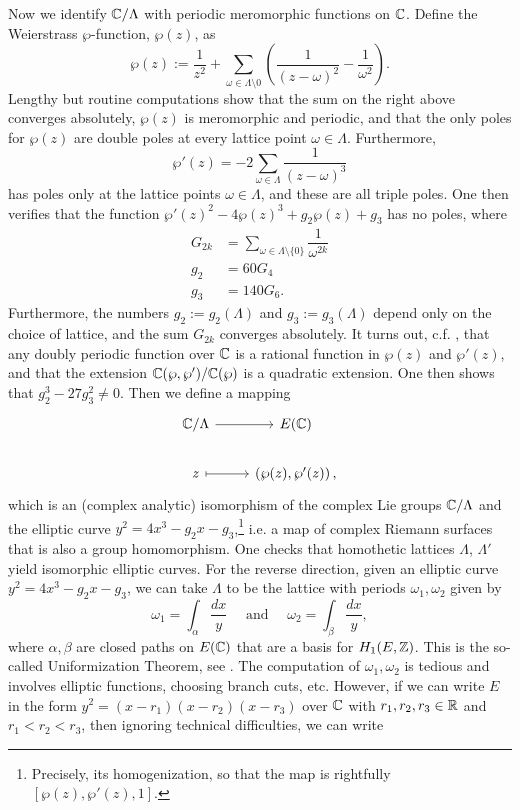 Now we identify $\mathbb{C}/\Lambda$ with periodic meromorphic functions on $\mathbb{C}$. Define the Weierstrass $\wp$-function, $\wp(z)$, as 
	\[
	\wp(z):= \dfrac{1}{z^2} + \sum_{\omega \in \Lambda \setminus 0} \left( \dfrac{1}{(z - \omega)^2} - \dfrac{1}{\omega^2} \right). 
	\]
Lengthy but routine computations show that the sum on the right above converges absolutely, $\wp(z)$ is meromorphic and periodic, and that the only poles for $\wp(z)$ are double poles at every lattice point $\omega \in \Lambda$. Furthermore,
	\[
	\wp'(z)= -2 \sum_{\omega \in \Lambda} \dfrac{1}{(z- \omega)^3}
	\]
has poles only at the lattice points $\omega \in \Lambda$, and these are all triple poles. One then verifies that the function $\wp'(z)^2 - 4 \wp(z)^3 + g_2 \wp(z) + g_3$ has no poles, where
	\[
	\begin{aligned}
	G_{2k}&= \sum_{\omega \in \Lambda \setminus \{0\}} \dfrac{1}{\omega^{2k}} \\
	g_2&= 60 G_4 \\
	g_3&= 140 G_6.
	\end{aligned}
	\]
Furthermore, the numbers $g_2:= g_2(\Lambda)$ and $g_3:= g_3(\Lambda)$ depend only on the choice of lattice, and the sum $G_{2k}$ converges absolutely. It turns out, c.f. \cite[VI.3]{silvermanarithmetic}, that any doubly periodic function over $\mathbb{C}$ is a rational function in $\wp(z)$ and $\wp'(z)$, and that the extension $\mathbb{C}(\wp, \wp')/\mathbb{C}(\wp)$ is a quadratic extension. One then shows that $g_2^3 - 27g_3^2 \neq 0$. Then we define a mapping
	\[
	\begin{tikzcd}
	\C/\Lambda \arrow{r} & E(\C) \\ 
	z \rar[maps to] & \left( \wp(z), \wp'(z) \right),
	\end{tikzcd}
	\]
which is an (complex analytic) isomorphism of the complex Lie groups $\mathbb{C}/\Lambda$ and the elliptic curve $y^2= 4x^3 - g_2 x - g_3$,\footnote{Precisely, its homogenization, so that the map is rightfully $[\wp(z), \wp'(z), 1]$.} i.e. a map of complex Riemann surfaces that is also a group homomorphism. One checks that homothetic lattices $\Lambda$, $\Lambda'$ yield isomorphic elliptic curves. For the reverse direction, given an elliptic curve $y^2= 4x^3 - g_2 x - g_3$, we can take $\Lambda$ to be the lattice with periods $\omega_1, \omega_2$ given by
	\[
	\omega_1= \int_\alpha \dfrac{dx}{y} \quad\text{ and }\quad \omega_2= \int_\beta \dfrac{dx}{y},
	\]
where $\alpha, \beta$ are closed paths on $E(\mathbb{C})$ that are a basis for $H_1(E, \mathbb{Z})$. This is the so-called Uniformization Theorem, see \cite[IV.5, Thm.~5.1]{silvermanarithmetic}. The computation of $\omega_1, \omega_2$ is tedious and involves elliptic functions, choosing branch cuts, etc. However, if we can write $E$ in the form $y^2= (x - r_1)(x - r_2)(x - r_3)$ over $\mathbb{C}$ with $r_1, r_2, r_3 \in \mathbb{R}$ and $r_1 < r_2 < r_3$, then ignoring technical difficulties, we can write

